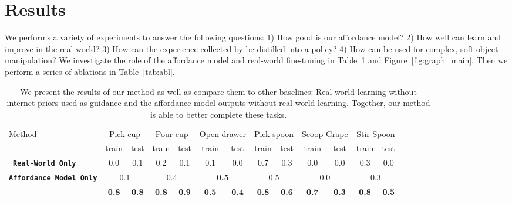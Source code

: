 \section{Results}
\label{sec:results}

We performs a variety of experiments to answer the following questions:  1) How good is our affordance model? 2) How well can \ours learn and improve in the real world? 3) How can the experience collected by \ours be distilled into a policy? 4) How can \ours be used for complex, soft object manipulation? We investigate the role of the affordance model and real-world fine-tuning in Table~\ref{tab:main} and Figure~\ref{fig:graph_main}. Then we perform a series of ablations in Table~\ref{tab:abl}.

\begin{table}[H]
    \centering
    \resizebox{\linewidth}{!}
    {%
        \begin{tabular}{lcccccccccccccccc}
        \toprule
        Method & \multicolumn{2}{c}{Pick cup} & \multicolumn{2}{c}{Pour cup} & \multicolumn{2}{c}{Open drawer} & \multicolumn{2}{c}{Pick spoon} & \multicolumn{2}{c}{Scoop Grape} & \multicolumn{2}{c}{Stir Spoon} & \\ 
        & train & test & train & test & train & test & train & test & train & test & train & test \\
        \midrule
        \
        \textbf{\texttt{Real-World Only}} & 0.0 & 0.1 & 0.2 & 0.1 & 0.1 & 0.0 & 0.7 & 0.3 & 0.0 & 0.0 & 0.3 & 0.0 \\ 
        \textbf{\texttt{Affordance Model Only}} & \multicolumn{2}{c}{0.1} & \multicolumn{2}{c}{0.4} & \multicolumn{2}{c}{\textbf{0.5}} & \multicolumn{2}{c}{0.5} & \multicolumn{2}{c}{0.0} & \multicolumn{2}{c}{0.3}\\ 
        
        \midrule
        \textbf{\texttt{\ours}} & \textbf{0.8} & \textbf{0.8} & \textbf{0.8} & \textbf{0.9} & \textbf{0.5} & \textbf{0.4} & \textbf{0.8} & \textbf{0.6} & \textbf{0.7} & \textbf{0.3} & \textbf{0.8} & \textbf{0.5}\\
        \bottomrule
        \end{tabular}
    }
    \vspace{0.05in}
    \caption{We present the results of our method as well as compare them to other baselines: Real-world learning without internet priors used as guidance and the affordance model outputs without real-world learning.  Together, our method is able to better complete these tasks.}
    \label{tab:main}
\end{table}



